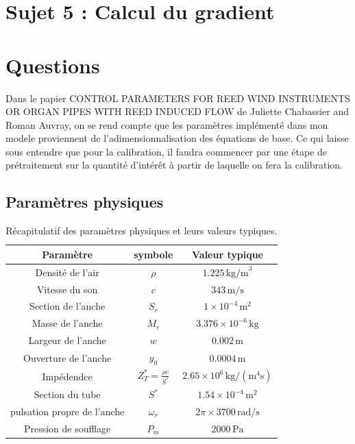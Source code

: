\documentclass[12pt,a4paper]{article}
\begin{document}
\newpage
\section{Sujet 5 : Calcul du gradient}


\newpage
\section{Questions}
Dans le papier CONTROL PARAMETERS FOR REED WIND INSTRUMENTS OR ORGAN PIPES WITH
REED INDUCED FLOW de Juliette Chabassier and Roman Auvray, on se rend compte que 
les paramètres implémenté dans mon modele proviennent de l'adimensionnalisation des
équations de base. Ce qui laisse sous entendre que pour la calibration, il faudra 
commencer par une étape de prétraitement sur la quantité d'intérêt à partir de 
laquelle on fera la calibration. 

\subsection{Paramètres physiques}

\begin{table}[h!]
    \centering
    \begin{tabular}{|c|c|c|}
        \hline
        \textbf{Paramètre} & \textbf{symbole} & \textbf{Valeur typique} \\
        \hline
        Densité de l'air & $\rho$ & $1.225 \, \text{kg/m}^3$ \\
        \hline
        Vitesse du son & $c$ & $343 \, \text{m/s}$ \\
        \hline
        Section de l'anche & $S_r$ & $1 \times 10^{-4} \, \text{m}^2$ \\
        \hline
        Masse de l'anche & $M_r$ & $3.376 \times 10^{-6} \, \text{kg}$ \\
        \hline
        Largeur de l'anche & $w$ & $0.002 \, \text{m}$ \\
        \hline
        Ouverture de l'anche & $y_0$ & $0.0004 \, \text{m}$ \\
        \hline
        Impédendce & $Z_T^\ast = \frac{\rho c}{S^\ast}$ & $2.65 \times 10^6 \, \text{kg/}(\text{m}^4\text{s})$ \\
        \hline
        Section du tube & $S^\ast$ & $1.54 \times 10^{-4} \, \text{m}^2$ \\
        \hline 
        pulsation propre de l'anche & $\omega_r$ & $2\pi \times 3700 \, \text{rad/s}$ \\
        \hline
        Pression de soufflage & $P_m$ & $2000 \, \text{Pa}$ \\
        \hline
        \end{tabular}
    \caption{Récapitulatif des paramètres physiques et leurs valeurs typiques.}
\end{table}
\end{document}
